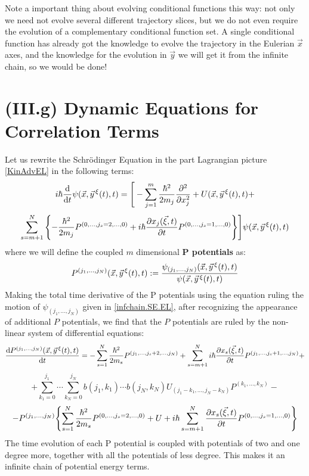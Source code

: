 \documentclass[11pt, a4paper]{article} %
\begin{document}
Note a important thing about evolving conditional functions this way: not only we need not evolve several different trajectory slices, but we do not even require the evolution of a complementary conditional function set. A single conditional function has already got the knowledge to evolve the trajectory in the Eulerian $\vec{x}$ axes, and the knowledge for the evolution in $\vec{y}$ we will get it from the infinite chain, so we would be done!

\section*{(III.g) Dynamic Equations for Correlation Terms\vspace{-0.15cm}}
Let us rewrite the Schrödinger Equation in the part Lagrangian picture \eqref{KinAdvEL} in the following terms:
\begin{equation}\label{Norsen}
i\hbar \dv{}{t}\psi(\vec{x},\vec{y}^{\, \xi}(t),t)=\Bigg[-\sum_{j=1}^m \frac{\hbar^2}{2m_j}\pdv[2]{}{x_j}+U(\vec{x},\vec{y}^{\, \xi}(t),t)+
\end{equation}
$$
\sum_{s=m+1}^N\qty{ -\frac{\hbar^2}{2m_j}P^{(0,...,j_s=2,...,0)}+i\hbar \pdv{x_j(\vec{\xi},t)}{t} P^{(0,...,j_s=1,...,0)} } \Bigg]\psi(\vec{x},\vec{y}^{\, \xi}(t),t)
$$
where we will define the coupled $m$ dimensional {\bf P potentials} as:\vspace{-0.1cm}
\begin{equation}\label{P}
P^{(j_1,...,j_N)}(\vec{x},\vec{y}^{\, \xi}(t),t):=\frac{\psi_{(j_1,...,j_N)}(\vec{x},\vec{y}^{\, \xi}(t),t)}{\psi(\vec{x},\vec{y}^{\, \xi}(t),t)}\vspace{-0.1cm}
\end{equation}
Making the total time derivative of the P potentials using the equation ruling the motion of $\psi_{(j_1,...,j_N)}$ given in \eqref{infchain.SE.EL}, after recognizing the appearance of additional $P$ potentials, we find that the $P$ potentials are ruled by the non-linear system of differential equations:\vspace{-0.15cm}
\begin{equation}
\dv{P^{(j_1,...,j_N)}(\vec{x},\vec{y}^{\, \xi}(t),t)}{t}=-\sum_{s=1}^N\frac{\hbar^2}{2m_s}P^{(j_1,...,j_s+2,...,j_N)}+\sum_{s=m+1}^Ni\hbar \pdv{x_s(\vec{\xi},t)}{t} P^{(j_1,...,j_s+1,...,j_N)}+\vspace{-0.3cm}
\end{equation}
$$
+\sum_{k_1=0}^{j_1}\cdots\sum_{k_N=0}^{j_N} b(j_1,k_1)\cdots b(j_N,k_N)U_{(j_1-k_1,...,j_N-k_N)}P^{(k_1,...,k_N)}-
$$
$$
-P^{(j_1,...,j_N)}\qty{ \sum_{s=1}^N\frac{\hbar^2}{2m_s} P^{(0,...,j_s=2,...,0)}+U+i\hbar\sum_{s=m+1}^N \pdv{x_s(\vec{\xi},t)}{t}P^{(0,...,j_s=1,...,0)} }
$$
The time evolution of each P potential is coupled with potentials of two and one degree more, together with all the potentials of less degree. This makes it an infinite chain of potential energy terms.
\end{document}
